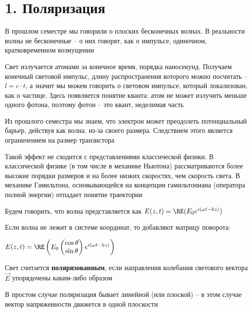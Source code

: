 \documentclass[12pt]{article}
\begin{document}
    \tableofcontents
    \clearpage




\section{1. Поляризация}

В прошлом семестре мы говорили о плоских бесконечных волнах. В реальности волны не бесконечные -- о них говорят, как о импульсе, одиночном, кратковременном возмущении

Свет излучается атомами за конечное время, порядка наносекунд. Получаем конечный световой импульс, длину распространения которого можно посчитать -- $l = c \cdot t$, а значит мы можем говорить о световом импульсе, который локализован, как о частице. Здесь появляется понятие кванта: атом не может излучить меньше одного фотона, поэтому фотон -- это квант, неделимая часть

Из прошлого семестра мы знаем, что электрон может преодолеть потенциальный барьер, действуя как волна, из-за своего размера. Следствием этого является ограничением на размер транзистора

Такой эффект не сходится с представлениями классической физики. В классической физике (в том числе в механике Ньютона) рассматриваются более высокие порядки размеров и на более низких скоростях, чем скорость света.
В механике Гамильтона, основывающейся на концепции гамильтониана (оператора полной энергии) отпадает понятие траектории

\mediumvspace

Будем говорить, что волна представляется как $E(z, t) = \RE(E_0 e^{i(\omega t - kz)})$

Если волна не лежит в системе координат, то добавляют матрицу поворота: 

$E(z, t) = \RE\left(E_0 \begin{pmatrix}\cos \theta \\ \sin \theta \end{pmatrix} e^{i(\omega t - kz)}\right)$

\smallvspace

Свет считается \textbf{поляризованным}, если направления колебания светового вектора $\vec E$ упорядочены каким-либо образом


В простом случае поляризация бывает линейной (или плоской) -- в этом случае вектор напряженности движется в одной плоскости
\end{document}
